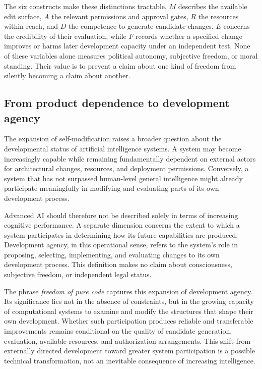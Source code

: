 \documentclass[11pt,a4paper]{article}
\begin{document}
The six constructs make these distinctions tractable. $M$ describes the available edit surface, $A$ the relevant permissions and approval gates, $R$ the resources within reach, and $D$ the competence to generate candidate changes. $E$ concerns the credibility of their evaluation, while $F$ records whether a specified change improves or harms later development capacity under an independent test. None of these variables alone measures political autonomy, subjective freedom, or moral standing. Their value is to prevent a claim about one kind of freedom from silently becoming a claim about another.

\subsection{From product dependence to development agency}
The expansion of self-modification raises a broader question about the developmental status of artificial intelligence systems. A system may become increasingly capable while remaining fundamentally dependent on external actors for architectural changes, resources, and deployment permissions. Conversely, a system that has not surpassed human-level general intelligence might already participate meaningfully in modifying and evaluating parts of its own development process.

Advanced AI should therefore not be described solely in terms of increasing cognitive performance. A separate dimension concerns the extent to which a system participates in determining how its future capabilities are produced. Development agency, in this operational sense, refers to the system's role in proposing, selecting, implementing, and evaluating changes to its own development process. This definition makes no claim about consciousness, subjective freedom, or independent legal status.

The phrase \emph{freedom of pure code} captures this expansion of development agency. Its significance lies not in the absence of constraints, but in the growing capacity of computational systems to examine and modify the structures that shape their own development. Whether such participation produces reliable and transferable improvements remains conditional on the quality of candidate generation, evaluation, available resources, and authorization arrangements. This shift from externally directed development toward greater system participation is a possible technical transformation, not an inevitable consequence of increasing intelligence.
\end{document}
